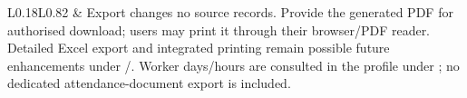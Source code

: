 {\begin{longtable}{L{0.18}L{0.82}}
\label{ac:062:c} & Export changes no source records. Provide the generated PDF for authorised download; users may print it through their browser/PDF reader. Detailed Excel export and integrated printing remain possible future enhancements under /. Worker days/hours are consulted in the profile under ; no dedicated attendance-document export is included.\\
\end{longtable}
}
